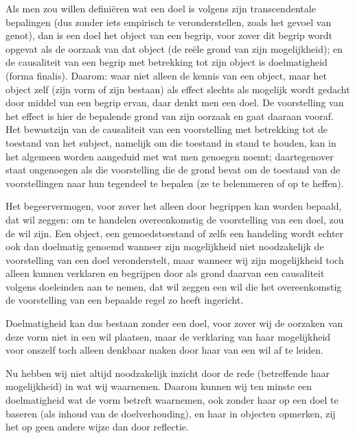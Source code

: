 Als men zou willen definiëren wat een doel is volgens zijn transcendentale bepalingen (dus zonder iets empirisch te veronderstellen, zoals het gevoel van genot), dan is een doel het object van een begrip, voor zover dit begrip wordt opgevat als de oorzaak van dat object (de reële grond van zijn mogelijkheid); en de causaliteit van een begrip met betrekking tot zijn object is doelmatigheid (forma finalis).
Daarom: waar niet alleen de kennis van een object, maar het object zelf (zijn vorm of zijn bestaan) als effect slechts als mogelijk wordt gedacht door middel van een begrip ervan, daar denkt men een doel. De voorstelling van het effect is hier de bepalende grond van zijn oorzaak en gaat daaraan vooraf. Het bewustzijn van de causaliteit van een voorstelling met betrekking tot de toestand van het subject, namelijk om die toestand in stand te houden, kan in het algemeen worden aangeduid met wat men genoegen noemt; daartegenover staat ongenoegen als die voorstelling die de grond bevat om de toestand van de voorstellingen naar hun tegendeel te bepalen (ze te belemmeren of op te heffen).

Het begeervermogen, voor zover het alleen door begrippen kan worden bepaald, dat wil zeggen: om te handelen overeenkomstig de voorstelling van een doel, zou de wil zijn. Een object, een gemoedstoestand of zelfs een handeling wordt echter ook dan doelmatig genoemd wanneer zijn mogelijkheid niet noodzakelijk de voorstelling van een doel veronderstelt, maar wanneer wij zijn mogelijkheid toch alleen kunnen verklaren en begrijpen door als grond daarvan een causaliteit volgens doeleinden aan te nemen, dat wil zeggen een wil die het overeenkomstig de voorstelling van een bepaalde regel zo heeft ingericht.

Doelmatigheid kan dus bestaan zonder een doel, voor zover wij de oorzaken van deze vorm niet in een wil plaatsen, maar de verklaring van haar mogelijkheid voor onszelf toch alleen denkbaar maken door haar van een wil af te leiden.

Nu hebben wij niet altijd noodzakelijk inzicht door de rede (betreffende haar mogelijkheid) in wat wij waarnemen. Daarom kunnen wij ten minste een doelmatigheid wat de vorm betreft waarnemen, ook zonder haar op een doel te baseren (als inhoud van de doelverhouding), en haar in objecten opmerken, zij het op geen andere wijze dan door reflectie.

